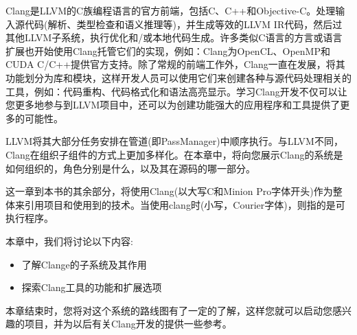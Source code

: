Clang是LLVM的C族编程语言的官方前端，包括C、C++和Objective-C。处理输入源代码(解析、类型检查和语义推理等)，并生成等效的LLVM IR代码，然后过其他LLVM子系统，执行优化和/或本地代码生成。许多类似C语言的方言或语言扩展也开始使用Clang托管它们的实现，例如：Clang为OpenCL、OpenMP和CUDA C/C++提供官方支持。除了常规的前端工作外，Clang一直在发展，将其功能划分为库和模块，这样开发人员可以使用它们来创建各种与源代码处理相关的工具，例如：代码重构、代码格式化和语法高亮显示。学习Clang开发不仅可以让您更多地参与到LLVM项目中，还可以为创建功能强大的应用程序和工具提供了更多的可能性。

LLVM将其大部分任务安排在管道(即PassManager)中顺序执行。与LLVM不同，Clang在组织子组件的方式上更加多样化。在本章中，将向您展示Clang的系统是如何组织的，角色分别是什么，以及其在源码的哪一部分。

\begin{tcolorbox}[colback=blue!5!white,colframe=blue!75!black, fonttitle=\bfseries,title=术语]
\hspace*{0.7cm}这一章到本书的其余部分，将使用Clang(以大写C和Minion Pro字体开头)作为整体来引用项目和使用到的技术。当使用clang时(小写，Courier字体)，则指的是可执行程序。
\end{tcolorbox}

本章中，我们将讨论以下内容:

\begin{itemize}
\item 了解Clange的子系统及其作用
\item 探索Clang工具的功能和扩展选项
\end{itemize}

本章结束时，您将对这个系统的路线图有了一定的了解，这样您就可以启动您感兴趣的项目，并为以后有关Clang开发的提供一些参考。


